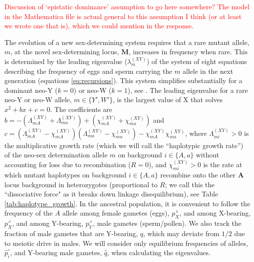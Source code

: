 \documentclass[10pt,letterpaper]{article}
\begin{document}
\textcolor{red}{Discussion of `epistatic dominance' assumption to go here somewhere? The model in the Mathematica file is actual general to this assumption I think (or at least we wrote one that is), which we could mention in the response.}

The evolution of a new sex-determining system requires that a rare mutant allele, $m$, at the novel sex-determining locus, $\mathbf{M}$, increases in frequency when rare. 
This is determined by the leading eigenvalue ($\lambda_m^{(XY)}$) of the system of eight equations describing the frequency of eggs and sperm carrying the $m$ allele in the next generation (equations \ref{eq:recursions}). %
This system simplifies substantially for a dominant neo-Y ($k=0$) or neo-W ($k=1$), see . 
The leading eigenvalue for a rare neo-Y or neo-W allele, $m\in\{Y',W'\}$, is the largest value of X that solves $x^2+ b x + c = 0$.  %
The coefficients are $b= - (\Lambda_{mA}^{(XY)} + \Lambda_{ma}^{(XY)})+(\chi_{mA}^{(XY)} + \chi_{ma}^{(XY)})$ and $c = (\Lambda_{mA}^{(XY)} - \chi_{mA}^{(XY)}) (\Lambda_{ma}^{(XY)} - \chi_{ma}^{(XY)}) - \chi_{mA}^{(XY)} \chi_{ma}^{(XY)}$, where $\Lambda_{mi}^{(XY)}>0$ is the multiplicative growth rate (which we will call the ``haplotypic growth rate'') of the neo-sex determination allele $m$ on background $i\in\{A,a\}$ without accounting for loss due to recombination ($R=0$), and $\chi_{mi}^{(XY)}>0$ is the rate at which mutant haplotypes on background $i\in\{A,a\}$ recombine onto the other $\mathbf{A}$ locus background in heterozygotes (proportional to $R$; we call this the ``dissociative force" as it breaks down linkage disequilibrium), see Table \ref{tab:haplotype_growth}.
In the ancestral population, it is convenient to follow the frequency of the $A$ allele among female gametes (eggs), $p^\female_X$, and among X-bearing, $p^\male_X$, and among Y-bearing, $p^\male_Y$, male gametes (sperm/pollen). 
We also track the fraction of male gametes that are Y-bearing, $q$, which may deviate from $1/2$ due to meiotic drive in males. 
We will consider only equilibrium frequencies of alleles, $\hat{p}^\circ_i$, and Y-bearing male gametes, $\hat{q}$, when calculating the eigenvalues.  
\end{document}
